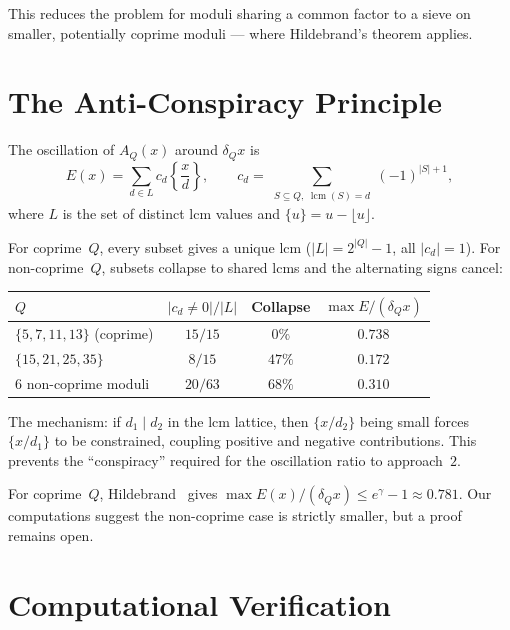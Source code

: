 \documentclass[11pt,a4paper]{amsart}
\theoremstyle{plain}
\theoremstyle{definition}
\newcommand{\lcmop}{\operatorname{lcm}}
\begin{document}
This reduces the problem for moduli sharing a common factor to a sieve on 
smaller, potentially coprime moduli --- where Hildebrand's theorem applies.

\section{The Anti-Conspiracy Principle}

The oscillation of $A_Q(x)$ around $\delta_Q x$ is
\[
E(x) = \sum_{d \in L} c_d \left\{\frac{x}{d}\right\}, \qquad
c_d = \sum_{\substack{S \subseteq Q,\; \lcmop(S)=d}} (-1)^{|S|+1},
\]
where $L$ is the set of distinct lcm values and $\{u\} = u - \lfloor u \rfloor$.

For coprime~$Q$, every subset gives a unique lcm ($|L| = 2^{|Q|}-1$, all $|c_d|=1$). 
For non-coprime~$Q$, subsets collapse to shared lcms and the alternating signs cancel:

\begin{center}
\begin{tabular}{lccc}
\hline
$Q$ & $|c_d \neq 0|/|L|$ & Collapse & $\max E/(\delta_Q x)$ \\
\hline
$\{5,7,11,13\}$ (coprime) & $15/15$ & $0\%$ & $0.738$ \\
$\{15,21,25,35\}$ & $8/15$ & $47\%$ & $0.172$ \\
$6$ non-coprime moduli & $20/63$ & $68\%$ & $0.310$ \\
\hline
\end{tabular}
\end{center}

The mechanism: if $d_1 \mid d_2$ in the lcm lattice, then $\{x/d_2\}$ 
being small forces $\{x/d_1\}$ to be constrained, coupling positive and 
negative contributions. This prevents the ``conspiracy'' required for 
the oscillation ratio to approach~$2$.

For coprime~$Q$, Hildebrand~\cite{Hi84} gives $\max E(x)/(\delta_Q x) \leq e^\gamma - 1 \approx 0.781$. 
Our computations suggest the non-coprime case is strictly smaller, but a proof remains open.

\section{Computational Verification}
\end{document}
